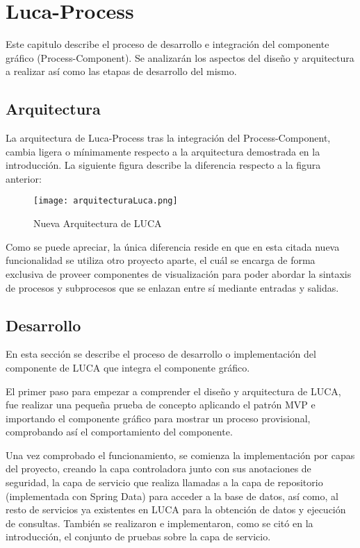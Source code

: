 \chapter{Luca-Process}
	
Este capitulo describe el proceso de desarrollo e integración del componente gráfico (Process-Component). Se analizarán los aspectos del diseño y arquitectura a realizar así como las etapas de desarrollo del mismo.
	
\section{Arquitectura}

La arquitectura  de Luca-Process tras la integración del Process-Component, cambia ligera o mínimamente respecto a la arquitectura demostrada en la introducción. La siguiente figura describe la diferencia respecto a la figura anterior:

\begin{figure}[H]
	\centering
	\texttt{[image: arquitecturaLuca.png]}
	\caption{Nueva Arquitectura de LUCA}\label{fig:arquitecturaLuca}
\end{figure}

Como se puede apreciar, la única diferencia reside en que en esta citada nueva funcionalidad se utiliza otro proyecto aparte, el cuál se encarga de forma exclusiva de proveer componentes de visualización para poder abordar la sintaxis de procesos y subprocesos que se enlazan entre sí mediante entradas y salidas.

\section{Desarrollo}

En esta sección se describe el proceso de desarrollo o implementación del componente de LUCA que integra el componente gráfico.

\vspace{5mm}

El primer paso para empezar a comprender el diseño y arquitectura de LUCA, fue realizar una pequeña prueba de concepto aplicando el patrón MVP\cite{mvp} e importando el componente gráfico para mostrar un proceso provisional, comprobando así el comportamiento del componente.


\vspace{5mm} 

Una vez comprobado el funcionamiento, se comienza la implementación por capas del proyecto, creando la capa controladora junto con sus anotaciones de seguridad, la capa de servicio que realiza llamadas a la capa de repositorio (implementada con Spring Data\cite{jpa}) para acceder a la base de datos, así como, al resto de servicios ya existentes en LUCA para la obtención de datos y ejecución de consultas. También se realizaron e implementaron, como se citó en la introducción, el conjunto de pruebas sobre la capa de servicio.

